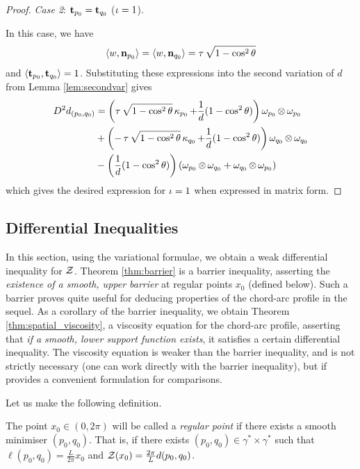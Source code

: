 \documentclass[11pt]{amsart}
\begin{document}
\begin{proof}
\emph{Case 2}: $\operatorname{\mathbf{t}}_{p_0} = \operatorname{\mathbf{t}}_{q_0}$ ($\operatorname{\iota} = 1$).

In this case, we have 
\[
\langle{w},{\operatorname{\mathbf{n}}_{p_0}}\rangle = \langle{w},{\operatorname{\mathbf{n}}_{q_0}}\rangle = \operatorname{\tau} \sqrt{1-\cos^2\theta}
\]
and $\langle{\operatorname{\mathbf{t}}_{p_0}},{\operatorname{\mathbf{t}}_{q_0}}\rangle = 1$. Substituting these expressions into the second variation of $d$  from Lemma \ref{lem:secondvar} gives
\begin{align*}
D^2d_{(p_0,q_0)} &=  \left(\operatorname{\tau} \sqrt{1-\cos^2\theta}\operatorname{\kappa}_{p_0} + \frac{1}{d}(1 - \cos^2\theta) \right) \omega_{p_0} \operatorname{\otimes} \omega_{p_0} \\
&+ \left(-\operatorname{\tau} \sqrt{1-\cos^2\theta} \operatorname{\kappa}_{q_0} + \frac{1}{d}(1 - \cos^2\theta) \right) \omega_{q_0} \operatorname{\otimes} \omega_{q_0} \\
&- \left(\frac{1}{d}(1 - \cos^2\theta) \right) \left(\omega_{p_0} \operatorname{\otimes} \omega_{q_0} + \omega_{q_0} \operatorname{\otimes} \omega_{p_0} \right)
\end{align*}
which gives the desired expression for $\operatorname{\iota}=1$ when expressed in matrix form.
\end{proof}

\subsection{Differential Inequalities}
\label{sec:orgheadline9}

In this section, using the variational formulae, we obtain a weak differential inequality for \(\operatorname{\mathcal{Z}}\). Theorem \ref{thm:barrier} is a barrier inequality, asserting the \emph{existence of a smooth, upper barrier} at regular points \(x_0\) (defined below). Such a barrier proves quite useful for deducing properties of the chord-arc profile in the sequel. As a corollary of the barrier inequality, we obtain Theorem \ref{thm:spatial_viscosity}, a viscosity equation for the chord-arc profile, asserting that \emph{if a smooth, lower support function exists}, it satisfies a certain differential inequality. The viscosity equation is weaker than the barrier inequality, and is not strictly necessary (one can work directly with the barrier inequality), but if provides a convenient formulation for comparisons.

Let us make the following definition.
\begin{defn}
The point \(x_0 \in (0, 2\pi)\) will be called a \emph{regular point} if there exists a smooth minimiser \((p_0, q_0)\). That is, if there exists \((p_0, q_0) \in \gamma^{\ast} \times \gamma^{\ast}\) such that \(\ell(p_0, q_0) = \tfrac{L}{2\pi} x_0\) and \(\operatorname{\mathcal{Z}}(x_0) = \tfrac{2\pi}{L} d(p_0, q_0)\).
\end{defn}
\end{document}
